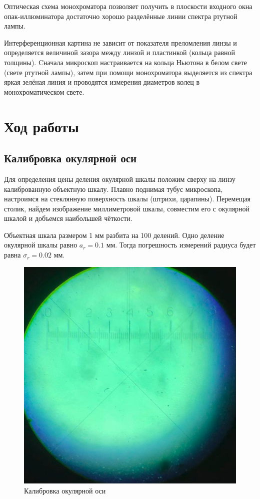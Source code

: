 Оптическая схема монохроматора позволяет получить в плоскости входного окна опак-иллюминатора достаточно хорошо разделённые линии спектра ртутной лампы.

Интерференционная картина не зависит от показателя преломления линзы и определяется величиной зазора между линзой и пластинкой (кольца равной толщины).
Cначала микроскоп настраивается на кольца Ньютона в белом свете (свете ртутной лампы), затем при помощи монохроматора выделяется из спектра яркая зелёная линия и проводятся измерения диаметров колец в монохроматическом свете.

\section*{Ход работы}

\subsection*{Калибровка окулярной оси}

Для определения цены деления окулярной шкалы положим сверху на линзу калиброванную объектную шкалу. Плавно поднимая тубус микроскопа, настроимся на стеклянную поверхность шкалы (штрихи, царапины). Перемещая столик, найдем изображение миллиметровой шкалы, совместим его с окулярной шкалой и добъемся наибольшей чёткости.

Объектная шкала размером 1 мм разбита на 100 делений. Одно деление окулярной шкалы равно $a_r = 0.1$ мм. Тогда погрешность измерений радиуса будет равна $\sigma_r = 0.02$ мм.

\begin{figure}[h!]
    \centering
    \includegraphics[width=12cm]{images/shkala.jpg}
    \caption{Калибровка окулярной оси}
\end{figure}

